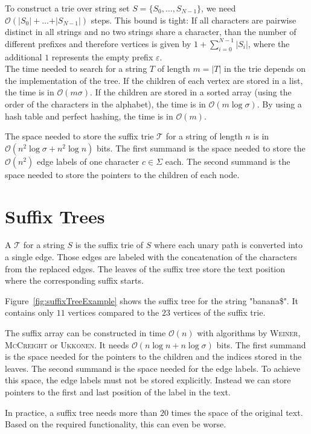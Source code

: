 To construct a trie over string set $S = \{S_0, \ldots, S_{N-1}\}$, we need $\mathcal{O}(\vert S_0 \vert + \ldots + \vert S_{N-1} \vert)$ steps. This bound is tight: If all characters are pairwise distinct in all strings and no two strings share a character, than the number of different prefixes and therefore vertices is given by $1 + \sum_{i=0}^{N-1} \vert S_i \vert$, where the additional $1$ represents the empty prefix $\varepsilon$.\\
The time needed to search for a string $T$ of length $m = \vert T \vert$ in the trie depends on the implementation of the tree. If the children of each vertex are stored in a list, the time is in $\mathcal{O}(m\sigma)$. If the children are stored in a sorted array (using the order of the characters in the alphabet), the time is in $\mathcal{O}(m\log \sigma)$. By using a hash table and perfect hashing, the time is in $\mathcal{O}(m)$.

The space needed to store the suffix trie $\mathcal{T}$ for a string of length $n$ is in $\mathcal{O}{(n^2\log \sigma + n^2\log n)}$ bits. The first summand is the space needed to store the $\mathcal{O}(n^2)$ edge labels of one character $c \in \Sigma$ each. The second summand is the space needed to store the pointers to the children of each node.

\section{Suffix Trees}

\begin{Definition}
  A  $\mathcal{T}$ for a string $S$ is the suffix trie of $S$ where each unary path is converted into a single edge. Those edges are labeled with the concatenation of the characters from the replaced edges. The leaves of the suffix tree store the text position where the corresponding suffix starts.
\end{Definition}

\begin{Example}
  Figure~\ref{fig:suffixTreeExample} shows the suffix tree for the string "banana\$". It contains only $11$ vertices compared to the $23$ vertices of the suffix trie.
\end{Example}

The suffix array can be constructed in time $\mathcal{O}(n)$ with algorithms by \textsc{Weiner}\cite{Weiner1973}, \textsc{McCreight}\cite{McCreight1976} or \textsc{Ukkonen}\cite{Ukkonen1995}. It needs $\mathcal{O}(n\log n + n\log \sigma)$ bits. The first summand is the space needed for the pointers to the children and the indices stored in the leaves. The second summand is the space needed for the edge labels. To achieve this space, the edge labels must not be stored explicitly. Instead we can store pointers to the first and last position of the label in the text.

In practice, a suffix tree needs more than $20$ times the space of the original text. Based on the required functionality, this can even be worse.
